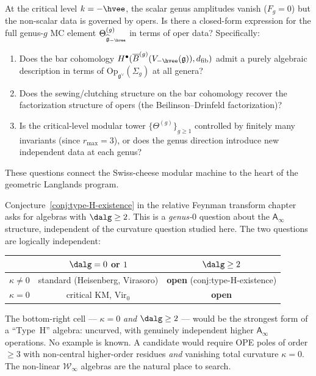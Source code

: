 \documentclass[11pt]{article}
\newcommand{\cW}{\mathcal{W}}
\newcommand{\fg}{\mathfrak{g}}
\newcommand{\barB}{\overline{B}}
\newcommand{\Ainf}{\mathsf{A}_{\infty}}
\newcommand{\dfib}{d_{\mathrm{fib}}}
\begin{document}
\begin{question}
\label{q:critical-modular-tower}
At the critical level $k = -\hvee$, the scalar genus
amplitudes vanish ($F_g = 0$) but the non-scalar data is
governed by opers.  Is there a closed-form expression for
the full genus-$g$ MC element
$\Theta^{(g)}_{\widehat{\fg}_{-\hvee}}$
in terms of oper data?  Specifically:
\begin{enumerate}[label=\textup{(\alph*)}]
\item Does the bar cohomology
  $H^\bullet(\barB^{(g)}(V_{-\hvee}(\fg)), \dfib)$
  admit a purely algebraic description in terms of
  $\mathrm{Op}_{\fg^\vee}(\Sigma_g)$ at all genera?
\item Does the sewing/clutching structure on the bar
  cohomology recover the factorization structure of
  opers (the Beilinson--Drinfeld factorization)?
\item Is the critical-level modular tower
  $\{\Theta^{(g)}\}_{g \geq 1}$ controlled by
  finitely many invariants (since $r_{\max} = 3$), or
  does the genus direction introduce new independent data
  at each genus?
\end{enumerate}
These questions connect the Swiss-cheese modular machine
to the heart of the geometric Langlands program.
\end{question}

\begin{remark}
\label{rem:type-H-conjecture-relation}
Conjecture~\ref{conj:type-H-existence} in the relative Feynman
transform chapter asks for algebras with $\dalg \geq 2$.
This is a \emph{genus-$0$} question about the $\Ainf$ structure,
independent of the curvature question studied here.
The two questions are logically independent:
\begin{center}
\renewcommand{\arraystretch}{1.2}
\begin{tabular}{ccc}
  & $\dalg = 0$ or $1$ & $\dalg \geq 2$ \\
\hline
$\kappa \neq 0$ & standard (Heisenberg, Virasoro)
  & \textbf{open} (conj:type-H-existence) \\
$\kappa = 0$ & critical KM, $\mathrm{Vir}_0$
  & \textbf{open}
\end{tabular}
\end{center}
The bottom-right cell --- $\kappa = 0$ \emph{and}
$\dalg \geq 2$ --- would be the strongest form of a
``Type~H'' algebra: uncurved, with genuinely independent higher
$\Ainf$ operations.  No example is known.  A candidate would
require OPE poles of order $\geq 3$ with non-central
higher-order residues \emph{and} vanishing total curvature $\kappa = 0$.
The non-linear $\cW_\infty$ algebras are the natural
place to search.
\end{remark}
\end{document}
